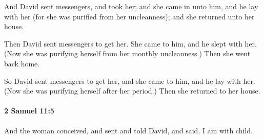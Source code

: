 			\begin{versebox}
					\item[BHS] 
					\item[ASV] And David sent messengers, and took her; and she came in unto him, and he lay with her (for she was purified from her uncleanness); and she returned unto her house.
					\item[NIV] Then David sent messengers to get her. She came to him, and he slept with her. (Now she was purifying herself from her monthly uncleanness.) Then she went back home.
					\item[NRSV] So David sent messengers to get her, and she came to him, and he lay with her. (Now she was purifying herself after her period.) Then she returned to her house.
			\end{versebox}

		\paragraph{2 Samuel 11:5} %
			\label{2SAMUEL-11-5}

			And the woman conceived, and sent and told David, and said, I am with child.

